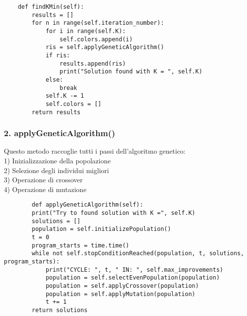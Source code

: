 \documentclass[12pt]{article}
\begin{document}
\begin{flushleft}
\begin{lstlisting}
    def findKMin(self):
        results = []
        for n in range(self.iteration_number):
            for i in range(self.K):
                self.colors.append(i)
            ris = self.applyGeneticAlgorithm()
            if ris:
                results.append(ris)
                print("Solution found with K = ", self.K)
            else:
                break
            self.K -= 1
            self.colors = []
        return results
\end{lstlisting}

\subsubsection*{2. applyGeneticAlgorithm()}
Questo metodo raccoglie tutti i passi dell'algoritmo genetico:\\
1) Inizializzazione della popolazione\\
2) Selezione degli individui migliori\\
3) Operazione di crossover\\
4) Operazione di mutazione\\

\begin{lstlisting}
        def applyGeneticAlgorithm(self):
        print("Try to found solution with K =", self.K)
        solutions = []
        population = self.initializePopulation()
        t = 0
        program_starts = time.time()
        while not self.stopConditionReached(population, t, solutions, program_starts):
            print("CYCLE: ", t, " IN: ", self.max_improvements)
            population = self.selectEvenPopulation(population)
            population = self.applyCrossover(population)
            population = self.applyMutation(population)
            t += 1
        return solutions
\end{lstlisting}

\end{flushleft}
\end{document}
